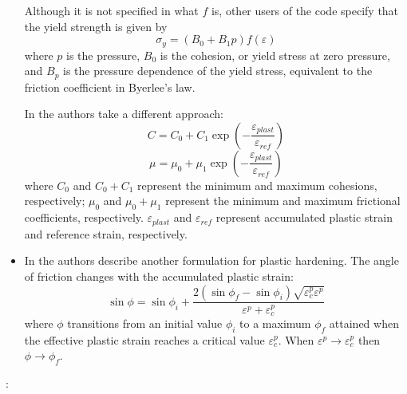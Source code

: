 \begin{itemize}
Although it is not specified in \cite{dyrm07} what $f$ is, other users of the code 
specify that the yield strength is given by 
\[
\sigma_y = (B_0 + B_1 p ) f(\varepsilon)
\]
where $p$ is the pressure, $B_0$ is the cohesion, or yield stress at
zero pressure, and $B_p$ is the pressure dependence of the yield
stress, equivalent to the friction coefficient in Byerlee's law. 

In \cite{yamz18} the authors take a different approach:
\[
C=C_0+C_1 \exp \left( -\frac{\varepsilon_{plast}}{\varepsilon_{ref}} \right)
\]
\[
\mu=\mu_0+\mu_1 \exp \left( -\frac{\varepsilon_{plast}}{\varepsilon_{ref}} \right)
\]
where $C_0$ and $C_0+C_1$ represent the minimum and maximum cohesions, respectively;
$\mu_0$ and $\mu_0+\mu_1$ represent the minimum and maximum frictional coefficients, respectively. 
$\varepsilon_{plast}$ and $\varepsilon_{ref}$ represent accumulated plastic strain and 
reference strain, respectively.

\item In \cite{leor89} the authors describe another formulation for plastic hardening. The angle of friction 
changes with the accumulated plastic strain:
\[
\sin \phi = \sin \phi_i  + \frac{2(\sin \phi_f - \sin\phi_i)\sqrt{\varepsilon^p_c  \varepsilon^p }}{\varepsilon^p + \varepsilon^p_c}
\] 
where $\phi$ transitions from an initial value $\phi_i$ to a maximum $\phi_f$ attained when the effective
plastic strain reaches a critical value $\varepsilon_c^p$. When $\varepsilon^p \rightarrow \varepsilon^p_c$
then $\phi \rightarrow \phi_f$.

\end{itemize}


\Literature: \cite{ster99,nigo15}
